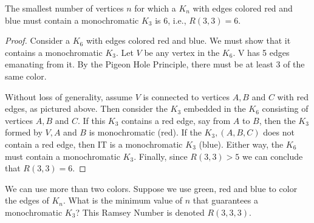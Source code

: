 \documentclass[handout]{ximera}
\begin{document}
\begin{theorem}[$R(3,3) = 6$]
The smallest number of vertices $n$ for which a $K_n$ with edges colored red and blue must contain a 
monochromatic $K_3$ is 6, i.e., $R(3,3) = 6$.
\end{theorem}
\begin{proof}
Consider a $K_6$ with edges colored red and blue. 
We must show that it contains a monochromatic $K_3$. Let $V$ be any vertex in the $K_6$. 
V has 5 edges emanating from it.  By the Pigeon Hole Principle, there must be at least 3 of the same color.

\begin{image}
\end{image}

Without loss of generality, assume $V$ is connected to vertices $A, B$ and $C$ with red edges, as pictured above. 
Then consider the $K_3$ embedded in the $K_6$ consisting of vertices $A, B$ and $C$.
If this $K_3$ contains a red edge, say from $A$ to $B$, then the $K_3$ formed by $V, A$ and $B$ is monochromatic (red).
If the $K_3, (A, B, C)$ does not contain a red edge, then IT is a monochromatic $K_3$ (blue).
Either way, the $K_6$ must contain a monochromatic $K_3$. Finally, since $R(3,3) > 5$ we can conclude that $R(3,3) = 6$.

\end{proof}


We can use more than two colors. Suppose we use green, red and blue to color the edges of $K_n$. 
What is the minimum value of $n$ that guarantees a monochromatic $K_3$? This Ramsey Number is denoted $R(3,3,3)$.
\end{document}
